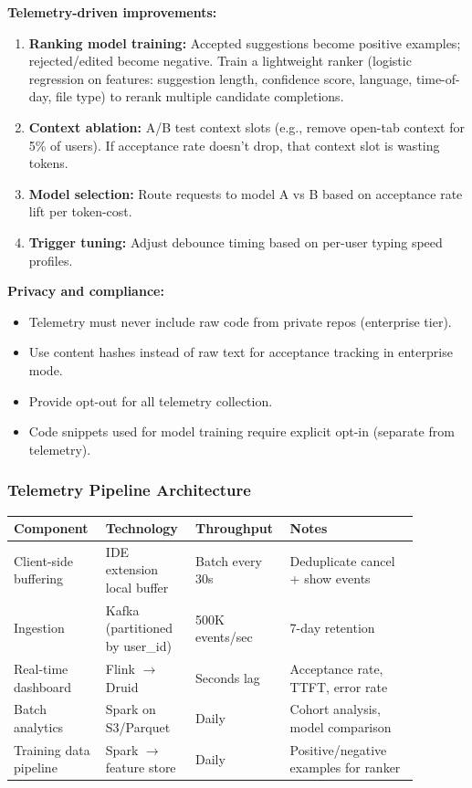 \textbf{Telemetry-driven improvements:}

\begin{enumerate}
  \item \textbf{Ranking model training:} Accepted suggestions become positive examples; rejected/edited become negative. Train a lightweight ranker (logistic regression on features: suggestion length, confidence score, language, time-of-day, file type) to rerank multiple candidate completions.
  \item \textbf{Context ablation:} A/B test context slots (e.g., remove open-tab context for 5\% of users). If acceptance rate doesn't drop, that context slot is wasting tokens.
  \item \textbf{Model selection:} Route requests to model A vs B based on acceptance rate lift per token-cost.
  \item \textbf{Trigger tuning:} Adjust debounce timing based on per-user typing speed profiles.
\end{enumerate}

\textbf{Privacy and compliance:}

\begin{itemize}
  \item Telemetry must never include raw code from private repos (enterprise tier).
  \item Use content hashes instead of raw text for acceptance tracking in enterprise mode.
  \item Provide opt-out for all telemetry collection.
  \item Code snippets used for model training require explicit opt-in (separate from telemetry).
\end{itemize}

\subsubsection*{Telemetry Pipeline Architecture}

\begin{tabular}{|p{0.20\linewidth}|p{0.20\linewidth}|p{0.18\linewidth}|p{0.30\linewidth}|}
\hline
\textbf{Component} & \textbf{Technology} & \textbf{Throughput} & \textbf{Notes} \\
\hline
Client-side buffering & IDE extension local buffer & Batch every 30s & Deduplicate cancel + show events \\
\hline
Ingestion & Kafka (partitioned by user\_id) & 500K events/sec & 7-day retention \\
\hline
Real-time dashboard & Flink $\rightarrow$ Druid & Seconds lag & Acceptance rate, TTFT, error rate \\
\hline
Batch analytics & Spark on S3/Parquet & Daily & Cohort analysis, model comparison \\
\hline
Training data pipeline & Spark $\rightarrow$ feature store & Daily & Positive/negative examples for ranker \\
\hline
\end{tabular}

